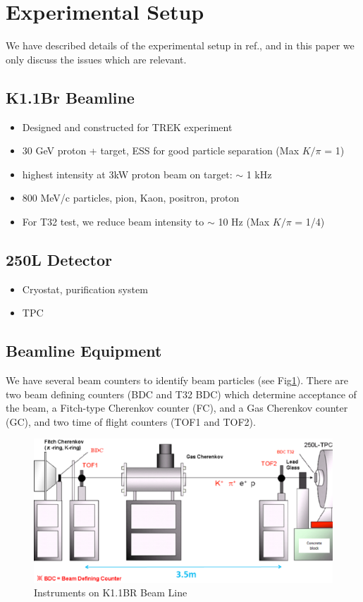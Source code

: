 \section{Experimental Setup}

We have described details of the experimental setup in ref.\cite{Araoka:2011pw},
and in this paper we only discuss the issues which are relevant.

\subsection{K1.1Br Beamline}
\begin{itemize}
\item Designed and constructed for TREK experiment
\item 30 GeV proton + target, ESS for good particle separation (Max $K/\pi$ = 1)
\item highest intensity at 3kW proton beam on target: $\sim$ 1 kHz 
\item 800 MeV/c particles, pion, Kaon, positron, proton
\item For T32 test, we reduce beam intensity to $\sim$ 10 Hz (Max $K/\pi$ = 1/4)
\end{itemize}

\subsection{250L Detector}
\begin{itemize}
\item Cryostat, purification system
\item TPC
\end{itemize}

\subsection{Beamline Equipment}

We have several beam counters to identify beam particles (see Fig\ref{fig:Beamline}).
There are two beam defining counters (BDC and T32 BDC) which determine acceptance of the beam, 
a Fitch-type Cherenkov counter (FC), 
and a Gas Cherenkov counter (GC), 
and two time of flight counters (TOF1 and TOF2).

\begin{figure}[htbp]
  \centering
  \includegraphics[width=1.0\hsize,clip]{fig/Beamline.eps}
  \caption{Instruments on K1.1BR Beam Line}
  \label{fig:Beamline}
\end{figure}

